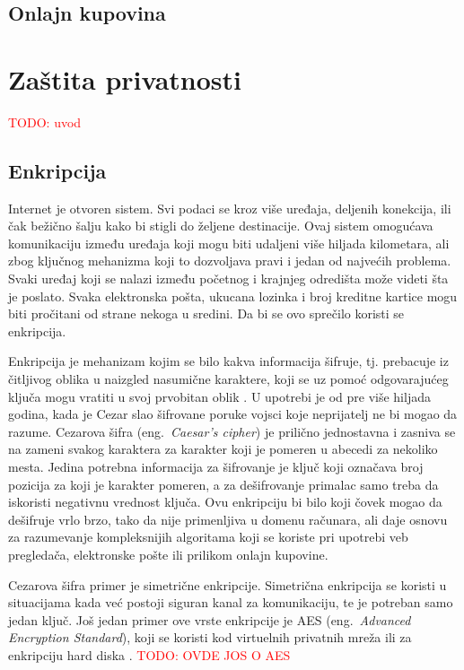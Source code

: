 \documentclass[a4paper]{article}
\newcommand\todos[1]{\textcolor{red}{#1}}
\begin{document}
\subsection{Onlajn kupovina}


\section{Zaštita privatnosti}
\label{sec:zastita}

\todos{TODO: uvod}


\subsection{Enkripcija} 
Internet je otvoren sistem. Svi podaci se kroz više uređaja, deljenih konekcija, ili čak bežično šalju kako bi stigli do željene destinacije. Ovaj sistem omogućava komunikaciju između uređaja koji mogu biti udaljeni više hiljada kilometara, ali zbog ključnog mehanizma koji to dozvoljava pravi i jedan od najvećih problema. Svaki uređaj koji se nalazi između početnog i krajnjeg  odredišta može videti šta je poslato. Svaka elektronska pošta, ukucana lozinka i broj kreditne kartice mogu biti pročitani od strane nekoga u sredini. Da bi se ovo sprečilo koristi se enkripcija.
\par Enkripcija je mehanizam kojim se bilo kakva informacija šifruje, tj. prebacuje iz čitljivog oblika u naizgled nasumične karaktere, koji se uz pomoć odgovarajućeg ključa mogu vratiti u svoj prvobitan oblik \cite{dataencryption}. U upotrebi je od pre više hiljada godina, kada je Cezar slao šifrovane poruke vojsci koje neprijatelj ne bi mogao da razume. Cezarova šifra (eng.~{\em Caesar's cipher}) je prilično jednostavna i zasniva se na zameni svakog karaktera za karakter koji je pomeren u abecedi za nekoliko mesta. Jedina potrebna informacija za šifrovanje je ključ koji označava broj pozicija za koji je karakter pomeren, a za dešifrovanje primalac samo treba da iskoristi negativnu vrednost ključa. Ovu enkripciju bi bilo koji čovek mogao da dešifruje vrlo brzo, tako da nije primenljiva u domenu računara, ali daje osnovu za razumevanje kompleksnijih algoritama koji se koriste pri upotrebi veb pregledača, elektronske pošte ili prilikom onlajn kupovine.
\par Cezarova šifra primer je simetrične enkripcije. Simetrična enkripcija se koristi u situacijama kada već postoji siguran kanal za komunikaciju, te je potreban samo jedan ključ. Još jedan primer ove vrste enkripcije je AES (eng.~{\em Advanced Encryption Standard}), koji se koristi kod virtuelnih privatnih mreža ili za enkripciju hard diska \cite{aes}. \todos{TODO: OVDE JOS O AES}
\end{document}
